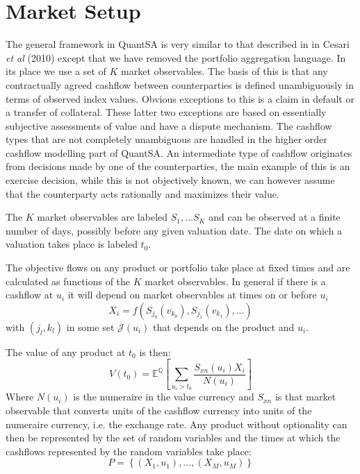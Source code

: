 \documentclass[a4paper,10pt]{article}
\newcommand{\E}{\mathbb{E}}                 %
\newcommand{\Q}{\mathbb{Q}}                 %
\begin{document}
\section{Market Setup}
The general framework in QuantSA is very similar to that described in in Cesari \textit{et al} (2010) \cite{cesari2010modelling} except that we have removed the portfolio aggregation language. In its place we use a set of $K$ market observables.  The basis of this is that any contractually agreed cashflow between counterparties is defined unambiguously in terms of observed index values.  Obvious exceptions to this is a claim in default or a transfer of collateral.  These latter two exceptions are based on essentially subjective assessments of value and have a dispute mechanism.  The cashflow types that are not completely unambiguous are handled in the higher order cashflow modelling part of QuantSA.  An intermediate type of cashflow originates from decisions made by one of the counterparties, the main example of this is an exercise decision, while this is not objectively known, we can however assume that the counterparty acts rationally and maximizes their value.

The $K$ market observables are labeled $S_1,...S_K$ and can be observed at a finite number of days, possibly before any given valuation date.  The date on which a valuation takes place is labeled $t_0$. 

The objective flows on any product or portfolio take place at fixed times and are calculated as functions of the $K$ market observables.  In general if there is a cashflow at $u_i$ it will depend on market observables at times on or before $u_i$
\begin{equation}
X_i = f(S_{j_0}(v_{k_0}), S_{j_1}(v_{k_1}), ...) 
\end{equation}
with $(j_l, k_l)$ in some set $\mathcal{J}(u_i)$ that depends on the product and $u_i$.

The value of any product at $t_0$ is then:
\begin{equation}
V(t_0) = \E^\Q\left[ \sum_{u_i>t_0}{\frac{S_{xn}(u_i)X_i}{N(u_i)}} \right]
\end{equation}
Where $N(u_i)$ is the numeraire in the value currency and $S_{xn}$ is that market observable that converts units of the cashflow currency into units of the numeraire currency, i.e. the exchange rate.
Any product without optionality can then be represented by the set of random variables and the times at which the cashflows represented by the random variables take place:
\begin{equation}
P = \left\{ \left(X_1, u_1\right), ..., \left(X_M, u_M\right) \right\}
\end{equation}
\end{document}
